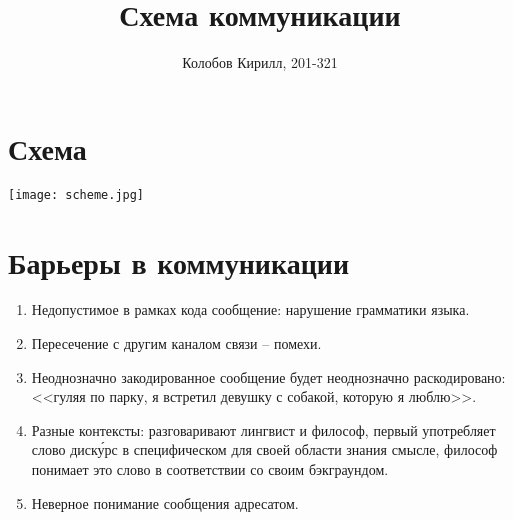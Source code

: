 \documentclass[a4paper,12pt]{report}
\author{Колобов Кирилл, 201-321}
\title{Схема коммуникации}
\date{}
\begin{document}
\maketitle

\chapter*{Схема}
\texttt{[image: scheme.jpg]}

\chapter*{Барьеры в коммуникации}
\begin{enumerate}
    \item{Недопустимое в рамках кода сообщение: нарушение грамматики языка.}
    \item{Пересечение с другим каналом связи -- помехи.}
    \item{Неоднозначно закодированное сообщение будет неоднозначно раскодировано: <<гуляя по парку, я встретил девушку с собакой, которую я люблю>>.}
    \item{Разные контексты: разговаривают лингвист и философ, первый употребляет слово диск\'{у}рс в специфическом для своей области знания смысле, философ понимает это слово в соответствии со своим бэкграундом.}
    \item{Неверное понимание сообщения адресатом.}
\end{enumerate}
\end{document}
